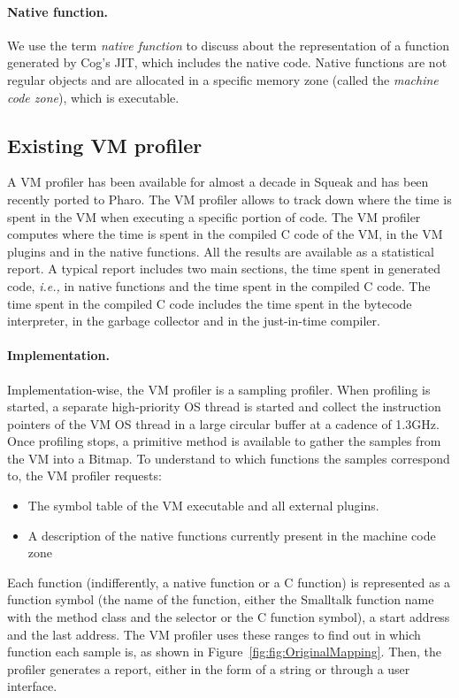 \documentclass[10pt,preprint]{sigplanconf}
\newcommand{\ie}{\emph{i.e.,}\xspace}
\newcommand{\figref}[1]{Figure~\ref{fig:#1}}
\begin{document}
\paragraph{Native function.} We use the term \emph{native function} to discuss about the representation of a function generated by Cog's JIT, which includes the native code. Native functions are not regular objects and are allocated in a specific memory zone (called the \emph{machine code zone}), which is executable.

\subsection{Existing VM profiler}

A VM profiler has been available for almost a decade in Squeak and has been recently ported to Pharo. The VM profiler allows to track down where the time is spent in the VM when executing a specific portion of code. The VM profiler computes where the time is spent in the compiled C code of the VM, in the VM plugins and in the native functions. All the results are available as a statistical report. A typical report includes two main sections, the time spent in generated code, \ie in native functions and the time spent in the compiled C code. The time spent in the compiled C code includes the time spent in the bytecode interpreter, in the garbage collector and in the just-in-time compiler. 


\paragraph{Implementation.} Implementation-wise, the VM profiler is a sampling profiler. When profiling is started, a separate high-priority OS thread is started and collect the instruction pointers of the VM OS thread in a large circular buffer at a cadence of 1.3GHz. Once profiling stops, a primitive method is available to gather the samples from the VM into a Bitmap. To understand to which functions the samples correspond to, the VM profiler requests:
\begin{itemize}
	\item The symbol table of the VM executable and all external plugins.
	\item A description of the native functions currently present in the machine code zone
\end{itemize}
Each function (indifferently, a native function or a C function) is represented as a function symbol (the name of the function, either the Smalltalk function name with the method class and the selector or the C function symbol), a start address and the last address. The VM profiler uses these ranges to find out in which function each sample is, as shown in \figref{fig:OriginalMapping}. Then, the profiler generates a report, either in the form of a string or through a user interface.
\end{document}

